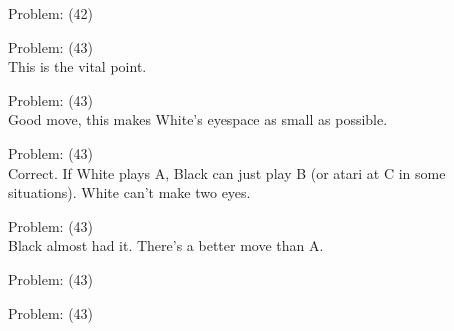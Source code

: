 \documentclass[11pt]{article}
\begin{document}
\begin{minipage}[t]{0.5\textwidth}
  {\centering
  
  Problem: (42)\\
  
  }
\end{minipage}
\begin{minipage}[t]{0.5\textwidth}
  {\centering
  
  Problem: (43)\\
  This is the vital point.\\
  }
\end{minipage}
\begin{minipage}[t]{0.5\textwidth}
  {\centering
  
  Problem: (43)\\
  Good move, this makes White's eyespace as small as possible.\\
  }
\end{minipage}
\begin{minipage}[t]{0.5\textwidth}
  {\centering
  
  Problem: (43)\\
  Correct. If White plays A, Black can just play B (or atari at C in some situations). White can't make two eyes.\\
  }
\end{minipage}
\begin{minipage}[t]{0.5\textwidth}
  {\centering
  
  Problem: (43)\\
  Black almost had it. There's a better move than A.\\
  }
\end{minipage}
\begin{minipage}[t]{0.5\textwidth}
  {\centering
  
  Problem: (43)\\
  
  }
\end{minipage}
\begin{minipage}[t]{0.5\textwidth}
  {\centering
  
  Problem: (43)\\
  
  }
\end{minipage}
\end{document}
